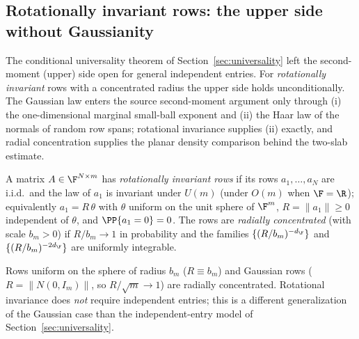 %
%

\subsection{Rotationally invariant rows: the upper side without Gaussianity}

The conditional universality theorem of Section~\ref{sec:universality} left the
second-moment (upper) side open for general independent entries.  For
\emph{rotationally invariant} rows with a concentrated radius the upper side holds
unconditionally.  The Gaussian law enters the source second-moment argument only
through (i) the one-dimensional marginal small-ball exponent and (ii) the Haar law
of the normals of random row spans; rotational invariance supplies (ii) exactly,
and radial concentration supplies the planar density comparison behind the
two-slab estimate.

\begin{definition}\label{def:rot-inv}
A matrix $A\in\F^{N\times m}$ has \emph{rotationally invariant rows} if its rows
$a_1,\dots,a_N$ are i.i.d.\ and the law of $a_1$ is invariant under $U(m)$ (under
$O(m)$ when $\F=\R$); equivalently $a_1=R\,\theta$ with $\theta$ uniform on the unit
sphere of $\F^m$, $R=\|a_1\|\ge0$ independent of $\theta$, and $\PP\{a_1=0\}=0$.
The rows are \emph{radially concentrated} (with scale $b_m>0$) if
$R/b_m\to1$ in probability and the families $\{(R/b_m)^{-d_\F}\}$ and
$\{(R/b_m)^{-2d_\F}\}$ are uniformly integrable.
\end{definition}

Rows uniform on the sphere of radius $b_m$ ($R\equiv b_m$) and Gaussian rows
($R=\|N(0,I_m)\|$, so $R/\sqrt m\to1$) are radially concentrated.  Rotational
invariance does \emph{not} require independent entries; this is a different
generalization of the Gaussian case than the independent-entry model of
Section~\ref{sec:universality}.

